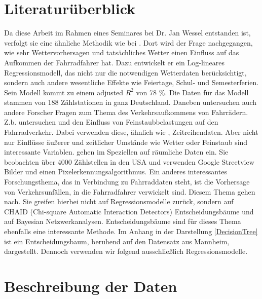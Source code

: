 \documentclass[a4paper,12pt]{thesis}
\begin{document}
\chapter{Literaturüberblick}

Da diese Arbeit im Rahmen eines Seminares bei Dr. Jan Wessel entstanden ist, verfolgt sie eine ähnliche Methodik wie bei \cite{Wessel2020}. Dort wird der Frage nachgegangen, wie sehr Wettervorhersagen und tatsächliches Wetter einen Einfluss auf das Aufkommen der Fahrradfahrer hat. Dazu entwickelt er ein Log-lineares Regressionsmodell, das nicht nur die notwendigen Wetterdaten berücksichtigt, sondern auch andere wesentliche Effekte wie Feiertage, Schul- und Semesterferien. Sein Modell kommt zu einem adjusted $R^2$ von 78 \%. Die Daten für das Modell stammen von 188 Zählstationen in ganz Deutschland. Daneben untersuchen auch andere Forscher Fragen zum Thema des Verkehrsaufkommens von Fahrrädern. Z.b. untersuchen \cite{ZHAO2018826} und \cite{Hong2022} den Einfluss von Feinstaubbelastungen auf den Fahrradverkehr. Dabei verwenden diese, ähnlich wie \cite{Wessel2020}, Zeitreihendaten. Aber nicht nur Einflüsse äußerer und zeitlicher Umstände wie Wetter oder Feinstaub sind interessante Variablen. \cite{HANKEY2021102651} gehen im Speziellen auf räumliche Daten ein. Sie beobachten über 4000 Zählstellen in den USA und verwenden Google Streetview Bilder und einen Pixelerkennungsalgorithmus. Ein anderes interessantes Forschungsthema, das in Verbindung zu Fahrraddaten steht, ist die Vorhersage von Verkehrsunfällen, in die Fahrradfahrer verwickelt sind. Diesem Thema gehen \cite{PRATI201744} nach. Sie greifen hierbei nicht auf Regressionsmodelle zurück, sondern auf CHAID (Chi-square Automatic Interaction Detectors) Entscheidungsbäume und auf Bayesian Netzwerkanalysen. Entscheidungsbäume sind für dieses Thema ebenfalls eine interessante Methode. Im Anhang in der Darstellung \ref{DecisionTree} ist ein Entscheidungsbaum, beruhend auf den Datensatz aus Mannheim, dargestellt. Dennoch verwenden wir folgend ausschließlich Regressionsmodelle.


\chapter{Beschreibung der Daten}
\end{document}
